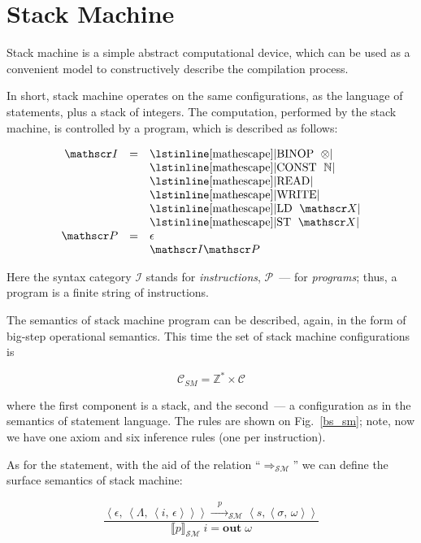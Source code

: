 \documentclass{article}
\def\transarrow{\xrightarrow}
\def\padding{\phantom{X}}
\def\subarrow{}
\newcommand{\setsubarrow}[1]{\def\subarrow{#1}}
\newcommand{\trule}[2]{\frac{#1}{#2}}
\newcommand{\trans}[3]{{#1}\transarrow{\padding{\textstyle #2}\padding}\subarrow{#3}}
\newcommand{\llang}[1]{\mbox{\lstinline[mathescape]|#1|}}
\newcommand{\inbr}[1]{\left<{#1}\right>}
\newcommand{\sembr}[1]{\llbracket{#1}\rrbracket}
\newcommand{\primi}[2]{\mathbf{#1}\;{#2}}
\theoremstyle{definition}
\begin{document}
\section{Stack Machine}

Stack machine is a simple abstract computational device, which can be used as a convenient model to constructively describe
the compilation process.

In short, stack machine operates on the same configurations, as the language of statements, plus a stack of integers. The
computation, performed by the stack machine, is controlled by a program, which is described as follows:

\[
\renewcommand{\arraystretch}{1}
\begin{array}{rcl}
  \mathscr I & = & \llang{BINOP $\;\otimes$} \\
             &   & \llang{CONST $\;\mathbb N$} \\
             &   & \llang{READ} \\
             &   & \llang{WRITE} \\
             &   & \llang{LD $\;\mathscr X$} \\
             &   & \llang{ST $\;\mathscr X$} \\
  \mathscr P & = & \epsilon \\
             &   & \mathscr I\mathscr P
\end{array}
\]

Here the syntax category $\mathscr I$ stands for \emph{instructions}, $\mathscr P$~--- for \emph{programs}; thus, a program is a finite
string of instructions.

The semantics of stack machine program can be described, again, in the form of big-step operational semantics. This time the set of
stack machine configurations is

\[
\mathscr C_{SM} = \mathbb Z^* \times \mathscr C
\]

where the first component is a stack, and the second~--- a configuration as in the semantics of statement language. The rules are shown on Fig.~\ref{bs_sm}; note,
now we have one axiom and six inference rules (one per instruction).

\setsubarrow{_{\mathscr{SM}}}

As for the statement, with the aid of the relation ``$\Rightarrow_{\mathscr{SM}}$'' we can define the surface semantics of stack machine:

\[
\trule{\trans{\inbr{\epsilon,\,\inbr{\Lambda,\,\inbr{i,\,\epsilon}}}}{p}{\inbr{s, \inbr{\sigma,\,\omega}}}}
      {\sembr{p}_{\mathscr{SM}}\;i=\primi{out}{\omega}}
\]
\end{document}
